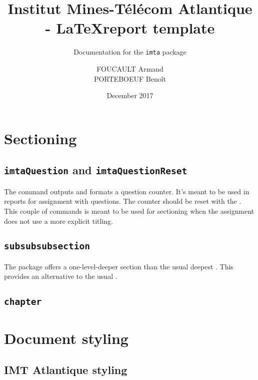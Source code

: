 \documentclass{article}
\author{FOUCAULT Armand\\PORTEBOEUF Benoît}
\date{December 2017}
\title{Institut Mines-Télécom Atlantique - \LaTeX report template}
\subtitle{Documentation for the \texttt{imta} package}
\begin{document}
\imtaMaketitlepage

\tableofcontents

\newpage


\section{Sectioning}

\subsection{\texttt{imtaQuestion} and \texttt{imtaQuestionReset}}
The  command outputs and formats a question counter.
It's meant to be used in reports for assignment with questions.
The counter should be reset with the .
This couple of commands is meant to be used for sectioning when the assignment does not use a more explicit titling.

\subsection{\texttt{subsubsubsection}}
The  package offers a one-level-deeper section than the usual deepest .
This provides an alternative to the usual .

\subsection{\texttt{chapter}}

\section{Document styling}

\subsection{IMT Atlantique styling}
\end{document}
